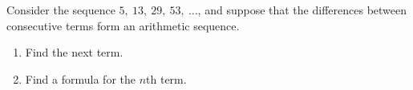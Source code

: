 Consider the sequence $5,\ 13,\ 29,\ 53,\ \dots$, and suppose that the differences between consecutive terms form an arithmetic sequence.
\begin{enumerate}
\item[(a)] Find the next term.
\item[(b)] Find a formula for the $n$th term.
\end{enumerate}
